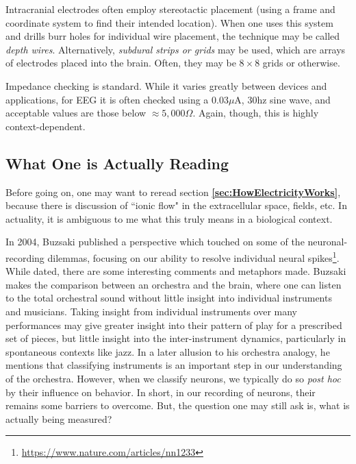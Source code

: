 Intracranial electrodes often employ stereotactic placement (using a frame and coordinate system to find their intended location). When one uses this system and drills burr holes for individual wire placement, the technique may be called \textit{depth wires}. Alternatively, \textit{subdural strips or grids} may be used, which are arrays of electrodes placed into the brain. Often, they may be $8\times 8$ grids or otherwise.\newline

Impedance checking is standard. While it varies greatly between devices and applications, for EEG it is often checked using a $0.03\mu$A, 30hz sine wave, and acceptable values are those below $\approx 5,000\Omega$. Again, though, this is highly context-dependent. 


\subsection{What One is Actually Reading}

\label{sec:WhatOneReads}
Before going on, one may want to reread section \textbf{\ref{sec:HowElectricityWorks}}, because there is discussion of ``ionic flow" in the extracellular space, fields, etc. In actuality, it is ambiguous to me what this truly means in a biological context. \newline
   
In 2004, Buzsaki published a perspective which touched on some of the neuronal-recording dilemmas, focusing on our ability to resolve individual neural spikes\footnote{\url{https://www.nature.com/articles/nn1233}}. While dated, there are some interesting comments and metaphors made. Buzsaki makes the comparison between an orchestra and the brain, where one can listen to the total orchestral sound without little insight into individual instruments and musicians. Taking insight from individual instruments over many performances may give greater insight into their pattern of play for a prescribed set of pieces, but little insight into the inter-instrument dynamics, particularly in spontaneous contexts like jazz. In a later allusion to his orchestra analogy, he mentions that classifying instruments is an important step in our understanding of the orchestra. However, when we classify neurons, we typically do so \textit{post hoc} by their influence on behavior. In short, in our recording of neurons, their remains some barriers to overcome. But, the question one may still ask is, what is actually being measured?\newline

